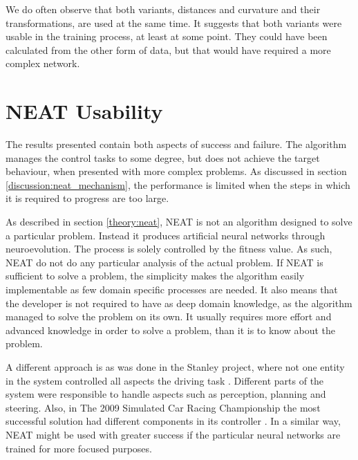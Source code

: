 We do often observe that both variants, distances and curvature and their transformations, are used at the same time. It suggests that both variants were usable in the training process, at least at some point. They could have been calculated from the other form of data, but that would have required a more complex network.

\section{NEAT Usability}

The results presented contain both aspects of success and failure. The algorithm manages the control tasks to some degree, but does not achieve the target behaviour, when presented with more complex problems. As discussed in section \ref{discussion:neat_mechanism}, the performance is limited when the steps in which it is required to progress are too large.

As described in section \ref{theory:neat}, NEAT is not an algorithm designed to solve a particular problem. Instead it produces artificial neural networks through neuroevolution. The process is solely controlled by the fitness value. As such, NEAT do not do any particular analysis of the actual problem. 
If NEAT is sufficient to solve a problem, the simplicity makes the algorithm easily implementable as few domain specific processes are needed. It also means that the developer is not required to have as deep domain knowledge, as the algorithm managed to solve the problem on its own. It usually requires more effort and advanced knowledge in order to solve a problem, than it is to know about the problem.

A different approach is as was done in the Stanley project, where not one entity in the system controlled all aspects the driving task \cite{Thrun06}. Different parts of the system were responsible to handle aspects such as perception, planning and steering. Also, in The 2009 Simulated Car Racing Championship the most successful solution had different components in its controller \cite{racingChamp2009}. In a similar way, NEAT might be used with greater success if the particular neural networks are trained for more focused purposes.

